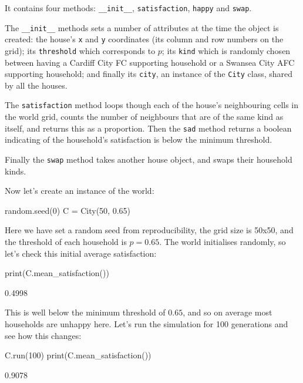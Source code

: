 It contains four methods: \texttt{__init__},
\texttt{satisfaction}, \texttt{happy} and
\texttt{swap}.

The \texttt{__init__} methods sets a number of attributes at the
time the object is created: the house's \texttt{x} and
\texttt{y} coordinates (its column and row numbers on the grid);
its \texttt{threshold} which corresponds to $p$; its
\texttt{kind} which is randomly chosen between having a Cardiff City
FC supporting household or a Swansea City AFC supporting household; and finally
its \texttt{city}, an instance of the \texttt{City}
class, shared by all the houses.

The \texttt{satisfaction} method loops though each of the house's
neighbouring cells in the world grid, counts the number of neighbours that are
of the same kind as itself, and returns this as a proportion.
Then the \texttt{sad} method returns a boolean indicating of the
household's satisfaction is below the minimum threshold.

Finally the \texttt{swap} method takes another house object, and
swaps their household kinds.

Now let's create an instance of the world:

\begin{pyin}
random.seed(0)
C = City(50, 0.65)
\end{pyin}

Here we have set a random seed from reproducibility, the grid size is 50x50, and
the threshold of each household is $p = 0.65$.
The world initialises randomly, so let's check this initial average
satisfaction:

\begin{pyin}
print(C.mean_satisfaction())
\end{pyin}

\begin{pyout}
0.4998
\end{pyout}

This is well below the minimum threshold of $0.65$, and so on average most
households are unhappy here.
Let's run the simulation for 100 generations and see how this changes:

\begin{pyin}
C.run(100)
print(C.mean_satisfaction())
\end{pyin}

\begin{pyout}
0.9078
\end{pyout}

